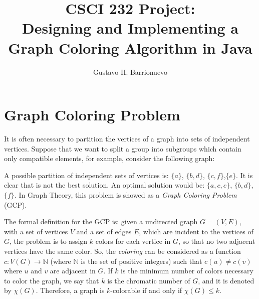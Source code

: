 \documentclass{article}
\begin{document}
\title{CSCI 232 Project: \\ Designing and Implementing a Graph Coloring Algorithm in Java}
\author{Gustavo H. Barrionuevo}

\maketitle

\section{Graph Coloring Problem}


It is often necessary to partition the vertices of a graph into sets of independent vertices. Suppose that we want to split a group into subgroups which contain only compatible elements, for example, consider the following graph:
\begin{center}
\end{center}
A possible partition of independent sets of vertices is: $\{ a \}$, $\{ b, d \}$, $ \{ c, f \}$,$ \{ e \}$. It is clear that is not the best solution. An optimal solution would be: $\{ a, c, e \} $, $ \{ b, d \}$, $ \{  f \}$. In Graph Theory, this problem is showed as a \emph{Graph Coloring Problem} (GCP)\cite{chartrand2008chromatic}.



The formal definition for the GCP is: given a undirected graph $G = (V, E)$, with a set of vertices $V$ and a set of edges $E$, which are incident to the vertices of $G$, the problem is to assign $k$ colors for each vertice in $G$, so that no two adjacent vertices have the same color. So, the \emph{coloring} can be considered as a function $c : V(G) \to \mathbb{N}$ (where $\mathbb{N}$ is the set of positive integers) such that $c(u) \neq c(v)$ where $u$ and $v$ are adjacent in $G$\cite{chartrand2008chromatic}. If $k$ is the minimum number of colors necessary to color the graph, we say that $k$ is the chromatic number of $G$, and it is denoted by $\chi(G)$. Therefore, a graph is $k$-colorable if and only if $\chi(G) \leq k$.  
\end{document}
